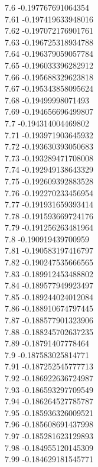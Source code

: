 {7.6	-0.197767691064354\\
7.61	-0.197419633948016\\
7.62	-0.197072176901761\\
7.63	-0.196725318934788\\
7.64	-0.196379059057784\\
7.65	-0.196033396282912\\
7.66	-0.195688329623818\\
7.67	-0.195343858095624\\
7.68	-0.19499998071493\\
7.69	-0.194656696499807\\
7.7	-0.194314004469802\\
7.71	-0.193971903645932\\
7.72	-0.193630393050683\\
7.73	-0.193289471708008\\
7.74	-0.192949138643329\\
7.75	-0.192609392883528\\
7.76	-0.192270233456954\\
7.77	-0.191931659393414\\
7.78	-0.191593669724176\\
7.79	-0.191256263481964\\
7.8	-0.190919439700959\\
7.81	-0.190583197416797\\
7.82	-0.190247535666565\\
7.83	-0.189912453488802\\
7.84	-0.189577949923497\\
7.85	-0.189244024012084\\
7.86	-0.188910674797445\\
7.87	-0.188577901323906\\
7.88	-0.188245702637235\\
7.89	-0.18791407778464\\
7.9	-0.187583025814771\\
7.91	-0.187252545777713\\
7.92	-0.186922636724987\\
7.93	-0.186593297709549\\
7.94	-0.186264527785787\\
7.95	-0.185936326009521\\
7.96	-0.185608691437998\\
7.97	-0.185281623129893\\
7.98	-0.184955120145309\\
7.99	-0.184629181545771\\
}
